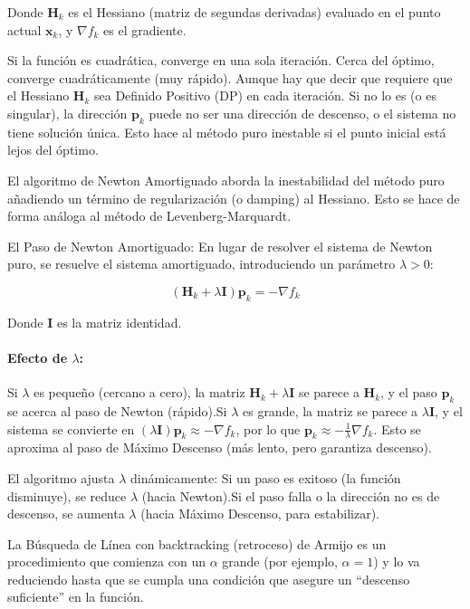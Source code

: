 \documentclass{article}
\begin{document}
Donde $\mathbf{H}_k$ es el Hessiano (matriz de segundas derivadas) evaluado en el punto actual $\mathbf{x}_k$, y $\nabla f_k$ es el gradiente.

 Si la función es cuadrática, converge en una sola iteración. Cerca del óptimo, converge cuadráticamente (muy rápido).
Aunque hay que decir que requiere que el Hessiano $\mathbf{H}_k$ sea Definido Positivo (DP) en cada iteración. Si no lo es (o es singular), la dirección $\mathbf{p}_k$ puede no ser una dirección de descenso, o el sistema no tiene solución única. Esto hace al método puro inestable si el punto inicial está lejos del óptimo.

El algoritmo de Newton Amortiguado aborda la inestabilidad del método puro añadiendo un término de regularización (o damping) al Hessiano. Esto se hace de forma análoga al método de Levenberg-Marquardt.

El Paso de Newton Amortiguado:
En lugar de resolver el sistema de Newton puro, se resuelve el sistema amortiguado, introduciendo un parámetro $\lambda > 0$:

\[
(\mathbf{H}_k + \lambda \mathbf{I}) \mathbf{p}_k = -\nabla f_k
\]

Donde $\mathbf{I}$ es la matriz identidad.

\paragraph{Efecto de $\lambda$:}

Si $\lambda$ es pequeño (cercano a cero), la matriz $\mathbf{H}_k + \lambda \mathbf{I}$ se parece a $\mathbf{H}_k$, y el paso $\mathbf{p}_k$ se acerca al paso de Newton (rápido).Si $\lambda$ es grande, la matriz se parece a $\lambda \mathbf{I}$, y el sistema se convierte en $(\lambda \mathbf{I}) \mathbf{p}_k \approx -\nabla f_k$, por lo que $\mathbf{p}_k \approx -\frac{1}{\lambda} \nabla f_k$. Esto se aproxima al paso de Máximo Descenso (más lento, pero garantiza descenso).


El algoritmo ajusta $\lambda$ dinámicamente:
Si un paso es exitoso (la función disminuye), se reduce $\lambda$ (hacia Newton).Si el paso falla o la dirección no es de descenso, se aumenta $\lambda$ (hacia Máximo Descenso, para estabilizar).

La Búsqueda de Línea con backtracking (retroceso) de Armijo es un procedimiento que comienza con un $\alpha$ grande (por ejemplo, $\alpha=1$) y lo va reduciendo hasta que se cumpla una condición que asegure un ``descenso suficiente'' en la función.
\end{document}
